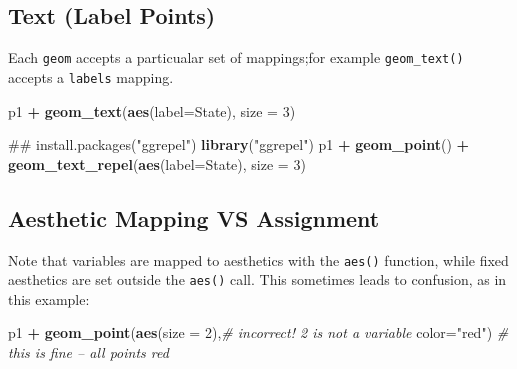 \documentclass[]{book}
\newenvironment{Shaded}{\begin{snugshade}}{\end{snugshade}}
\newcommand{\KeywordTok}[1]{\textcolor[rgb]{0.13,0.29,0.53}{\textbf{#1}}}
\newcommand{\DataTypeTok}[1]{\textcolor[rgb]{0.13,0.29,0.53}{#1}}
\newcommand{\DecValTok}[1]{\textcolor[rgb]{0.00,0.00,0.81}{#1}}
\newcommand{\StringTok}[1]{\textcolor[rgb]{0.31,0.60,0.02}{#1}}
\newcommand{\CommentTok}[1]{\textcolor[rgb]{0.56,0.35,0.01}{\textit{#1}}}
\newcommand{\OperatorTok}[1]{\textcolor[rgb]{0.81,0.36,0.00}{\textbf{#1}}}
\newcommand{\NormalTok}[1]{#1}
\begin{document}
\subsection{Text (Label Points)}\label{text-label-points}

Each \texttt{geom} accepts a particualar set of mappings;for example
\texttt{geom\_text()} accepts a \texttt{labels} mapping.

\begin{Shaded}
\begin{Highlighting}[]
\NormalTok{p1 }\OperatorTok{+}\StringTok{ }
\StringTok{  }\KeywordTok{geom_text}\NormalTok{(}\KeywordTok{aes}\NormalTok{(}\DataTypeTok{label=}\NormalTok{State), }\DataTypeTok{size =} \DecValTok{3}\NormalTok{)}
\end{Highlighting}
\end{Shaded}

\begin{Shaded}
\begin{Highlighting}[]
\NormalTok{## install.packages("ggrepel") }
\KeywordTok{library}\NormalTok{(}\StringTok{"ggrepel"}\NormalTok{)}
\NormalTok{p1 }\OperatorTok{+}\StringTok{ }
\StringTok{  }\KeywordTok{geom_point}\NormalTok{() }\OperatorTok{+}\StringTok{ }
\StringTok{  }\KeywordTok{geom_text_repel}\NormalTok{(}\KeywordTok{aes}\NormalTok{(}\DataTypeTok{label=}\NormalTok{State), }\DataTypeTok{size =} \DecValTok{3}\NormalTok{)}
\end{Highlighting}
\end{Shaded}

\subsection{Aesthetic Mapping VS
Assignment}\label{aesthetic-mapping-vs-assignment}

Note that variables are mapped to aesthetics with the \texttt{aes()}
function, while fixed aesthetics are set outside the \texttt{aes()}
call. This sometimes leads to confusion, as in this example:

\begin{Shaded}
\begin{Highlighting}[]
\NormalTok{p1 }\OperatorTok{+}
\StringTok{  }\KeywordTok{geom_point}\NormalTok{(}\KeywordTok{aes}\NormalTok{(}\DataTypeTok{size =} \DecValTok{2}\NormalTok{),}\CommentTok{# incorrect! 2 is not a variable}
             \DataTypeTok{color=}\StringTok{"red"}\NormalTok{) }\CommentTok{# this is fine -- all points red}
\end{Highlighting}
\end{Shaded}
\end{document}

